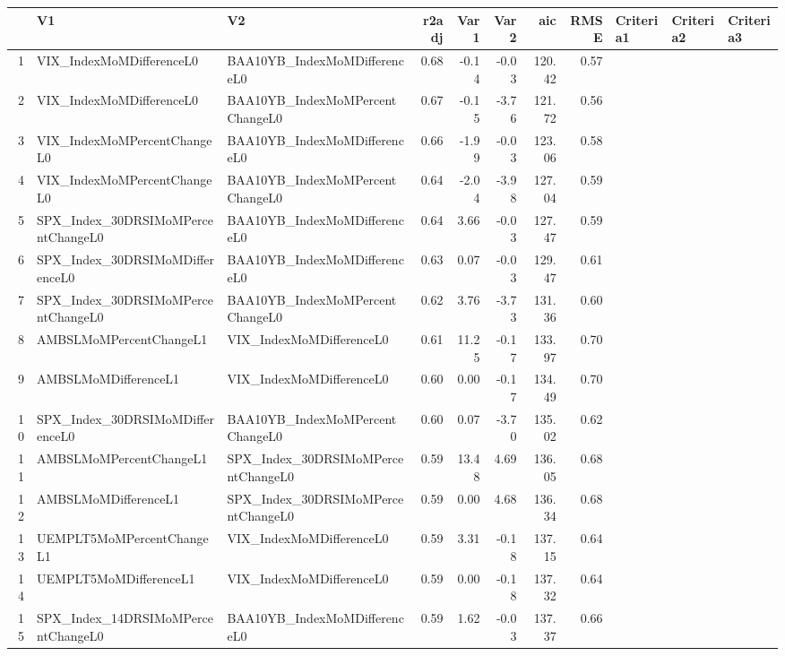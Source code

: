 \begin{longtable}{rllrrrrrlll}
  \hline
 & V1 & V2 & r2adj & Var1 & Var2 & aic & RMSE & Criteria1 & Criteria2 & Criteria3 \\ 
  \hline
1 & VIX\_IndexMoMDifferenceL0 & BAA10YB\_IndexMoMDifferenceL0 & 0.68 & -0.14 & -0.03 & 120.42 & 0.57 &  &  &  \\ 
  2 & VIX\_IndexMoMDifferenceL0 & BAA10YB\_IndexMoMPercentChangeL0 & 0.67 & -0.15 & -3.76 & 121.72 & 0.56 &  &  &  \\ 
  3 & VIX\_IndexMoMPercentChangeL0 & BAA10YB\_IndexMoMDifferenceL0 & 0.66 & -1.99 & -0.03 & 123.06 & 0.58 &  &  &  \\ 
  4 & VIX\_IndexMoMPercentChangeL0 & BAA10YB\_IndexMoMPercentChangeL0 & 0.64 & -2.04 & -3.98 & 127.04 & 0.59 &  &  &  \\ 
  5 & SPX\_Index\_30DRSIMoMPercentChangeL0 & BAA10YB\_IndexMoMDifferenceL0 & 0.64 & 3.66 & -0.03 & 127.47 & 0.59 &  &  &  \\ 
  6 & SPX\_Index\_30DRSIMoMDifferenceL0 & BAA10YB\_IndexMoMDifferenceL0 & 0.63 & 0.07 & -0.03 & 129.47 & 0.61 &  &  &  \\ 
  7 & SPX\_Index\_30DRSIMoMPercentChangeL0 & BAA10YB\_IndexMoMPercentChangeL0 & 0.62 & 3.76 & -3.73 & 131.36 & 0.60 &  &  &  \\ 
  8 & AMBSLMoMPercentChangeL1 & VIX\_IndexMoMDifferenceL0 & 0.61 & 11.25 & -0.17 & 133.97 & 0.70 &  &  &  \\ 
  9 & AMBSLMoMDifferenceL1 & VIX\_IndexMoMDifferenceL0 & 0.60 & 0.00 & -0.17 & 134.49 & 0.70 &  &  &  \\ 
  10 & SPX\_Index\_30DRSIMoMDifferenceL0 & BAA10YB\_IndexMoMPercentChangeL0 & 0.60 & 0.07 & -3.70 & 135.02 & 0.62 &  &  &  \\ 
  11 & AMBSLMoMPercentChangeL1 & SPX\_Index\_30DRSIMoMPercentChangeL0 & 0.59 & 13.48 & 4.69 & 136.05 & 0.68 &  &  &  \\ 
  12 & AMBSLMoMDifferenceL1 & SPX\_Index\_30DRSIMoMPercentChangeL0 & 0.59 & 0.00 & 4.68 & 136.34 & 0.68 &  &  &  \\ 
  13 & UEMPLT5MoMPercentChangeL1 & VIX\_IndexMoMDifferenceL0 & 0.59 & 3.31 & -0.18 & 137.15 & 0.64 &  &  &  \\ 
  14 & UEMPLT5MoMDifferenceL1 & VIX\_IndexMoMDifferenceL0 & 0.59 & 0.00 & -0.18 & 137.32 & 0.64 &  &  &  \\ 
  15 & SPX\_Index\_14DRSIMoMPercentChangeL0 & BAA10YB\_IndexMoMDifferenceL0 & 0.59 & 1.62 & -0.03 & 137.37 & 0.66 &  &  &  \\ 

\end{longtable}
